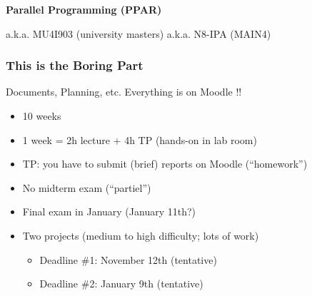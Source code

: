 \documentclass[10pt]{beamer}
\subtitle{Organisation}
\author[C. Bouillaguet]{\textbf{Charles Bouillaguet / Pierre Jolivet}}
\institute[SU]{Sorbonne Université}
\date{PPAR}
\begin{document}

\begin{frame}
  
  \centering

  
  \vspace{1cm}
  
  \textbf{\Large Parallel Programming (PPAR)}

  \bigskip

  a.k.a. MU4I903 (university masters) a.k.a. N8-IPA (MAIN4)
\end{frame}


\begin{frame}
  \frametitle{This is the Boring Part}

  \begin{block}{Documents, Planning, etc.}
    Everything is on Moodle !!
  \end{block}
  
  \begin{itemize}
  \item 10 weeks
  \item 1 week = 2h lecture + 4h TP (hands-on in lab room)
  \item TP: you have to submit (brief) reports on Moodle (``homework'')
  \item No midterm exam (``partiel'')
  \item Final exam in January (January 11th?)
  \item Two projects (medium to high difficulty; lots of work)
    \begin{itemize}
    \item Deadline \#1: November 12th (tentative)
    \item Deadline \#2: January 9th (tentative)
    \end{itemize}
  \end{itemize}
\end{frame}

\end{document}
